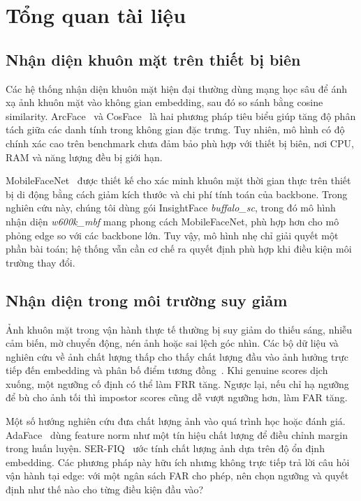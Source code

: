 \section{Tổng quan tài liệu}

\subsection{Nhận diện khuôn mặt trên thiết bị biên}

Các hệ thống nhận diện khuôn mặt hiện đại thường dùng mạng học sâu để ánh xạ ảnh khuôn mặt vào không gian embedding, sau đó so sánh bằng cosine similarity. ArcFace~\cite{deng2019arcface} và CosFace~\cite{wang2018cosface} là hai phương pháp tiêu biểu giúp tăng độ phân tách giữa các danh tính trong không gian đặc trưng. Tuy nhiên, mô hình có độ chính xác cao trên benchmark chưa đảm bảo phù hợp với thiết bị biên, nơi CPU, RAM và năng lượng đều bị giới hạn.

MobileFaceNet~\cite{chen2018mobilefacenets} được thiết kế cho xác minh khuôn mặt thời gian thực trên thiết bị di động bằng cách giảm kích thước và chi phí tính toán của backbone. Trong nghiên cứu này, chúng tôi dùng gói InsightFace \textit{buffalo\_sc}, trong đó mô hình nhận diện \textit{w600k\_mbf} mang phong cách MobileFaceNet, phù hợp hơn cho mô phỏng edge so với các backbone lớn. Tuy vậy, mô hình nhẹ chỉ giải quyết một phần bài toán; hệ thống vẫn cần cơ chế ra quyết định phù hợp khi điều kiện môi trường thay đổi.

\subsection{Nhận diện trong môi trường suy giảm}

Ảnh khuôn mặt trong vận hành thực tế thường bị suy giảm do thiếu sáng, nhiễu cảm biến, mờ chuyển động, nén ảnh hoặc sai lệch góc nhìn. Các bộ dữ liệu và nghiên cứu về ảnh chất lượng thấp cho thấy chất lượng đầu vào ảnh hưởng trực tiếp đến embedding và phân bố điểm tương đồng~\cite{knoche2021xqlfw,yang2020darkface}. Khi genuine scores dịch xuống, một ngưỡng cố định có thể làm FRR tăng. Ngược lại, nếu chỉ hạ ngưỡng để bù cho ảnh tối thì impostor scores cũng dễ vượt ngưỡng hơn, làm FAR tăng.

Một số hướng nghiên cứu đưa chất lượng ảnh vào quá trình học hoặc đánh giá. AdaFace~\cite{kim2022adaface} dùng feature norm như một tín hiệu chất lượng để điều chỉnh margin trong huấn luyện. SER-FIQ~\cite{terhorst2020serfiq} ước tính chất lượng ảnh dựa trên độ ổn định embedding. Các phương pháp này hữu ích nhưng không trực tiếp trả lời câu hỏi vận hành tại edge: với một ngân sách FAR cho phép, nên chọn ngưỡng và quyết định như thế nào cho từng điều kiện đầu vào?

